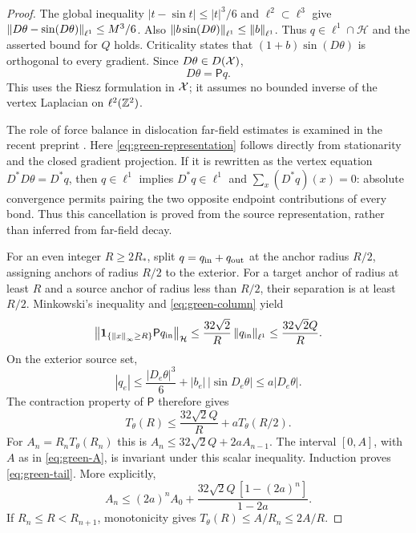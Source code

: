 \begin{proof}
The global inequality $|t-\sin t|\le|t|^3/6$ and
$\ell^2\subset\ell^3$ give
$\left\lVert D\theta-\sin(D\theta)\right\rVert_{\ell^1}\le M^3/6$.
Also $\left\lVert b\sin(D\theta)\right\rVert_{\ell^1}\le\left\lVert b\right\rVert_{\ell^1}$.
Thus $q\in\ell^1\cap\mathcal H$ and the asserted bound for $Q$ holds.
Criticality states that $(1+b)\sin(D\theta)$ is orthogonal to every
gradient.  Since $D\theta\in D(\mathcal X)$,
\begin{equation}
 D\theta=\mathsf Pq.
 \label{eq:green-representation}
\end{equation}
This uses the Riesz formulation in $\mathcal X$; it assumes no bounded inverse
of the vertex Laplacian on $\ell^2(\mathbb Z^2)$.

The role of force balance in dislocation far-field estimates is examined
in the recent preprint \cite{BraunHudson2026}. Here
\eqref{eq:green-representation} follows directly from stationarity and
the closed gradient projection. If it is rewritten as the vertex equation
$D^*D\theta=D^*q$, then $q\in\ell^1$ implies $D^*q\in\ell^1$ and
$\sum_x(D^*q)(x)=0$: absolute convergence permits pairing the two
opposite endpoint contributions of every bond. Thus this cancellation
is proved from the source representation, rather than inferred from
far-field decay.

For an even integer $R\ge2R_*$, split $q=q_{\rm in}+q_{\rm out}$ at
the anchor radius $R/2$, assigning anchors of radius $R/2$ to the exterior.
For a target anchor of radius at least $R$ and a source anchor of radius
less than $R/2$, their separation is at least $R/2$.
Minkowski's inequality and \eqref{eq:green-column} yield
\[
 \left\lVert\mathbf1_{\{\left\lVert x\right\rVert_\infty\ge R\}}
              \mathsf Pq_{\rm in}\right\rVert_{\mathcal H}
 \le\frac{32\sqrt2}{R}\left\lVert q_{\rm in}\right\rVert_{\ell^1}
 \le\frac{32\sqrt2 Q}{R}.
\]
On the exterior source set,
\[
 |q_e|\le\frac{|D_e\theta|^3}{6}
          +|b_e|\,|\sin D_e\theta|
 \le a|D_e\theta|.
\]
The contraction property of $\mathsf P$ therefore gives
\begin{equation}
 T_\theta(R)\le\frac{32\sqrt2 Q}{R}+aT_\theta(R/2).
 \label{eq:green-recurrence}
\end{equation}
For $A_n=R_nT_\theta(R_n)$ this is
$A_n\le32\sqrt2 Q+2aA_{n-1}$.  The interval $[0,A]$, with $A$ as
in \eqref{eq:green-A}, is invariant under this scalar inequality.
Induction proves \eqref{eq:green-tail}.  More explicitly,
\[
 A_n\le(2a)^nA_0+
       \frac{32\sqrt2 Q\,[1-(2a)^n]}{1-2a}.
\]
If $R_n\le R<R_{n+1}$, monotonicity gives
$T_\theta(R)\le A/R_n\le2A/R$.
\end{proof}

